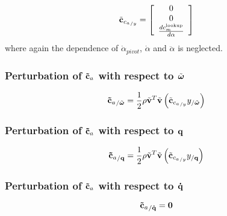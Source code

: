 \begin{equation}
\tilde{\bm{\mathbf{c}}}_{{c_{a}}_{/y}} = \left[
	\begin{array}{cccc}
		0\\
		0\\
		\frac{ d c_m^{\text{lookup}}}{d \alpha} 
	\end{array} \right]
\end{equation}
where again the dependence of $\dot{\alpha}_{pivot}$, $\dot{\alpha}$ and $\ddot{\alpha}$ is 
neglected.
\subsubsection{Perturbation of $\bm{\mathbf{\tilde{c}}}_a$ with respect to $\tilde{\bm{\mathbf{\omega}}}$}
\begin{equation}
{\bm{\mathbf{\tilde{c}}}_a}_{/\tilde{\bm{\mathbf{\omega}}}} = 
	\frac{1}{2} \rho \tilde{\bm{\mathbf{v}}}^T \tilde{\bm{\mathbf{v}}} 
	\left(  \tilde{\bm{\mathbf{c}}}_{{c_{a}}_{/y}} y_{/\tilde{\bm{\mathbf{\omega}}}}  \right) 
\end{equation}
\subsubsection{Perturbation of $\bm{\mathbf{\tilde{c}}}_a$ with respect to $\bm{\mathbf{q}}$}
\begin{equation}
{\bm{\mathbf{\tilde{c}}}_a}_{/\bm{\mathbf{q}}} = 
	\frac{1}{2} \rho \tilde{\bm{\mathbf{v}}}^T \tilde{\bm{\mathbf{v}}} 
	\left(  \tilde{\bm{\mathbf{c}}}_{{c_{a}}_{/y}} y_{/\bm{\mathbf{q}}}  \right) 
\end{equation}
\subsubsection{Perturbation of $\bm{\mathbf{\tilde{c}}}_a$ with respect to $\bm{\mathbf{\dot{q}}}$}
\begin{equation}
{\bm{\mathbf{\tilde{c}}}_a}_{/\bm{\mathbf{\dot{q}}}} = \bm{\mathbf{0}}
\end{equation}

